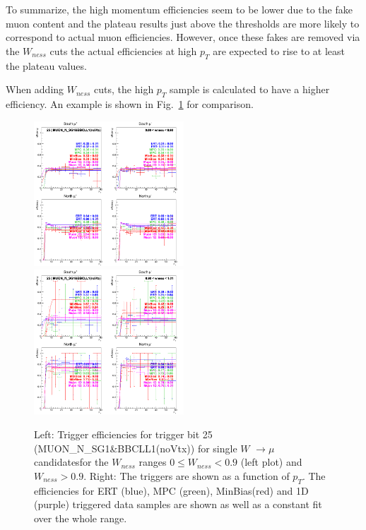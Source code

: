 To summarize, the high momentum efficiencies seem to be lower due to the fake
muon content and the plateau results just above the thresholds are more likely
to correspond to actual muon efficiencies. However, once these fakes are removed
via the $W_{ness}$ cuts the actual efficiencies at high $p_T$
are expected to rise to at least the plateau values.  

When adding $W_{ness}$ cuts, the high $p_T$ sample is calculated to have a
higher efficiency. An example is shown in
Fig.~\ref{fig:run13_trigeffiptlowhighpt} for comparison.

\begin{figure}[ht]
  \centering
  \includegraphics[width=0.5\textwidth]{./figures/run13_trigeffipt_iw0_trig25_lin.png}
  \includegraphics[width=0.5\textwidth]{./figures/run13_trigeffipt_iw1_trig25_lin.png}
  \caption{
    Left: Trigger efficiencies for trigger bit 25 (MUON\_N\_SG1\&BBCLL1(noVtx))
    for single $W$ $\rightarrow \mu$ candidatesfor the $W_{ness}$ ranges  $ 0
    \leq W_{ness} < 0.9 $ (left plot) and $W_{ness} > 0.9$. Right: The triggers
    are shown as a function of $p_T$. The efficiencies for ERT
    (blue), MPC (green), MinBias(red) and 1D (purple) triggered data samples are
    shown as well as a constant fit over the whole range.
  }
  \label{fig:run13_trigeffiptlowhighpt} 
\end{figure}

